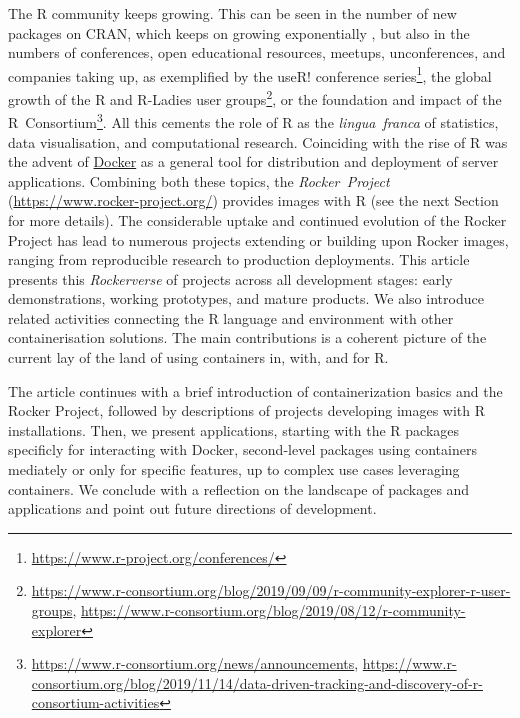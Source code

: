 The R community keeps growing. This can be seen in the number of new
packages on CRAN, which keeps on growing exponentially
\citep{cran:2019}, but also in the numbers of conferences, open
educational resources, meetups, unconferences, and companies taking up,
as exemplified by the useR! conference
series\footnote{\href{https://www.r-project.org/conferences/}{https://www.r-project.org/conferences/}},
the global growth of the R and R-Ladies user
groups\footnote{\href{https://www.r-consortium.org/blog/2019/09/09/r-community-explorer-r-user-groups}{https://www.r-consortium.org/blog/2019/09/09/r-community-explorer-r-user-groups}, \href{https://www.r-consortium.org/blog/2019/08/12/r-community-explorer}{https://www.r-consortium.org/blog/2019/08/12/r-community-explorer}},
or the foundation and impact of the
R~Consortium\footnote{\href{https://www.r-consortium.org/news/announcements}{https://www.r-consortium.org/news/announcements}, \href{https://www.r-consortium.org/blog/2019/11/14/data-driven-tracking-and-discovery-of-r-consortium-activities}{https://www.r-consortium.org/blog/2019/11/14/data-driven-tracking-and-discovery-of-r-consortium-activities}}.
All this cements the role of R as the \emph{lingua~franca} of
statistics, data visualisation, and computational research. Coinciding
with the rise of R was the advent of
\href{https://en.wikipedia.org/wiki/Docker_(software)}{Docker} as a
general tool for distribution and deployment of server applications.
Combining both these topics, the \emph{Rocker~Project}
(\url{https://www.rocker-project.org/}) provides images with R (see the
next Section for more details). The considerable uptake and continued
evolution of the Rocker Project has lead to numerous projects extending
or building upon Rocker images, ranging from reproducible research to
production deployments. This article presents this \emph{Rockerverse} of
projects across all development stages: early demonstrations, working
prototypes, and mature products. We also introduce related activities
connecting the R language and environment with other containerisation
solutions. The main contributions is a coherent picture of the current
lay of the land of using containers in, with, and for R.

The article continues with a brief introduction of containerization
basics and the Rocker Project, followed by descriptions of projects
developing images with R installations. Then, we present applications,
starting with the R packages specificly for interacting with Docker,
second-level packages using containers mediately or only for specific
features, up to complex use cases leveraging containers. We conclude
with a reflection on the landscape of packages and applications and
point out future directions of development.

